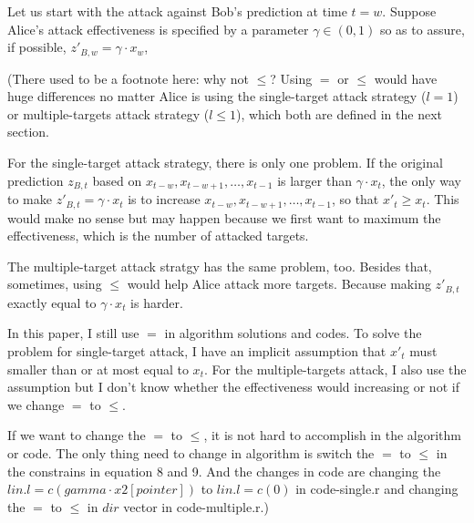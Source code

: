 \documentclass[journal]{IEEEtran}
\begin{document}
Let us start with the attack against Bob's prediction at time {\color{purple}$t=w$}. Suppose Alice's attack effectiveness is specified by a parameter $\gamma\in (0,1)$ so as to assure, if possible, $z'_{B,w}=\gamma \cdot x_{w}$,

{\color{purple}(There used to be a footnote here: why not $\leq$? Using $=$ or $\leq$ would have huge differences no matter Alice is using the single-target attack strategy ($l=1$) or multiple-targets attack strategy ($l\leq 1$), which both are defined in the next section. 

For the single-target attack strategy, there is only one problem. If the original prediction $z_{B,t}$ based on $x_{t-w}, x_{t-w+1},\dots,x_{t-1}$ is larger than $\gamma \cdot x_{t}$, the only way to make $z'_{B,t}=\gamma \cdot x_{t}$ is to increase $x_{t-w}, x_{t-w+1},\dots,x_{t-1}$, so that $x'_t\geq x_t$. This would make no sense but may happen because we first want to maximum the effectiveness, which is the number of attacked targets.

The multiple-target attack stratgy has the same problem, too. Besides that, sometimes, using $\leq$ would help Alice attack more targets. Because making $z'_{B,t}$ exactly equal to $\gamma \cdot x_{t}$ is harder.

In this paper, I still use $=$ in algorithm solutions and codes. To solve the problem for single-target attack, I have an implicit assumption that $x'_t$ must smaller than or at most equal to $x_t$. For the multiple-targets attack, I also use the assumption but I don't know whether the effectiveness would increasing or not if we change $=$ to $\leq$.

If we want to change the $=$ to $\leq$, it is not hard to accomplish in the algorithm or code. The only thing need to change in algorithm is switch the $=$ to $\leq$ in the constrains in equation 8 and 9. And the changes in code are changing the $lin.l = c(gamma\cdot x2[pointer])$ to $lin.l = c(0)$ in code-single.r and changing the $=$ to $\leq$ in $dir$ vector in code-multiple.r.)}
\end{document}
